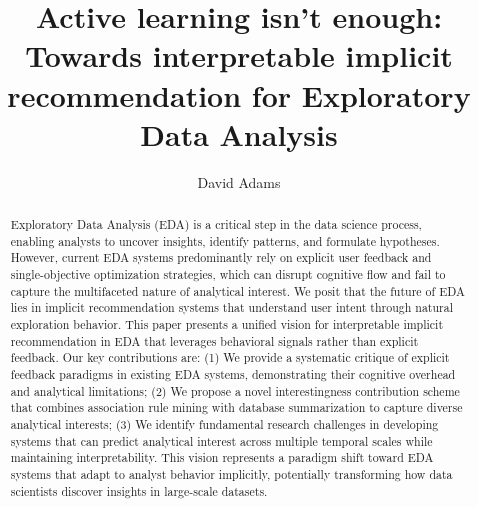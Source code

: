 \documentclass[sigconf, nonacm]{acmart}
\begin{document}
\title{Active learning isn't enough: Towards interpretable implicit recommendation for Exploratory Data Analysis}

\author{David Adams}

\begin{abstract}

Exploratory Data Analysis (EDA) is a critical step in the data science process, enabling analysts to uncover insights, identify patterns, and formulate hypotheses. However, current EDA systems predominantly rely on explicit user feedback and single-objective optimization strategies, which can disrupt cognitive flow and fail to capture the multifaceted nature of analytical interest. We posit that the future of EDA lies in implicit recommendation systems that understand user intent through natural exploration behavior. This paper presents a unified vision for interpretable implicit recommendation in EDA that leverages behavioral signals rather than explicit feedback. Our key contributions are: (1) We provide a systematic critique of explicit feedback paradigms in existing EDA systems, demonstrating their cognitive overhead and analytical limitations; (2) We propose a novel interestingness contribution scheme that combines association rule mining with database summarization to capture diverse analytical interests; (3) We identify fundamental research challenges in developing systems that can predict analytical interest across multiple temporal scales while maintaining interpretability. This vision represents a paradigm shift toward EDA systems that adapt to analyst behavior implicitly, potentially transforming how data scientists discover insights in large-scale datasets.


\end{abstract}

\maketitle
\end{document}

